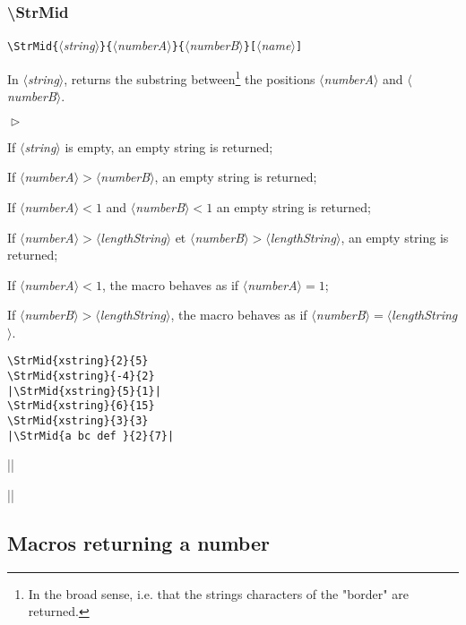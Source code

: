 \documentclass[a4paper,10pt]{article}
\newcommand\guill[1]{"#1"}
\newcommand\argu[1]{$\langle$\textit{#1}$\rangle$}
\newcommand\ARGU[1]{\texttt{\{}\argu{#1}\texttt{\}}}
\newcommand\arguC[1]{\texttt{[}\argu{#1}\texttt{]}}
\newenvironment{Conditions}[1][1cm]%
{\begin{list}%
	{$\vartriangleright$}%
	{\setlength{\leftmargin}{#1}
	 \setlength{\itemsep}{0pt}
	 \setlength{\parsep}{0pt}
	 \setlength{\topsep}{2ptplus3ptminus2pt}
	}}%
{\end{list}}
\newcommand\styleexemple{\small\vskip4pt}
\newcommand\verbinline{\lstinline[basicstyle=\normalsize\ttfamily]}
\begin{document}
\subsubsection{\ttfamily\textbackslash StrMid}

\verbinline|\StrMid|\ARGU{string}\ARGU{numberA}\ARGU{numberB}\arguC{name}
\smallskip

In \argu{string}, returns the substring between\footnote{In the broad sense, i.e. that the strings characters of the \guill{border} are returned.} the positions \argu{numberA} and \argu{numberB}.\medskip

\begin{Conditions}
\item If \argu{string} is empty, an empty string is returned;
\item If \argu{numberA}${}>{}$\argu{numberB}, an empty string is returned;
\item If \argu{numberA}${}<1$ and \argu{numberB}${}<1$ an empty string is returned;
\item If \argu{numberA}${}>{}$\argu{lengthString} et \argu{numberB}${}>{}$\argu{lengthString}, an empty string is returned;
\item If \argu{numberA}${}<1$, the macro behaves as if \argu{numberA}${}=1$;
\item If \argu{numberB}${}>{}$\argu{lengthString}, the macro behaves as if \argu{numberB}${}={}$\argu{lengthString}.
\end{Conditions}

\begin{minipage}[t]{0.65\linewidth}
\begin{lstlisting}
\StrMid{xstring}{2}{5}
\StrMid{xstring}{-4}{2}
|\StrMid{xstring}{5}{1}|
\StrMid{xstring}{6}{15}
\StrMid{xstring}{3}{3}
|\StrMid{a bc def }{2}{7}|
\end{lstlisting}%
\end{minipage}\hfill
\begin{minipage}[t]{0.35\linewidth}
	\styleexemple
	\par
	\par
	||\par
	\par
	\par
	||
\end{minipage}%

\subsection{Macros returning a number}
\end{document}
